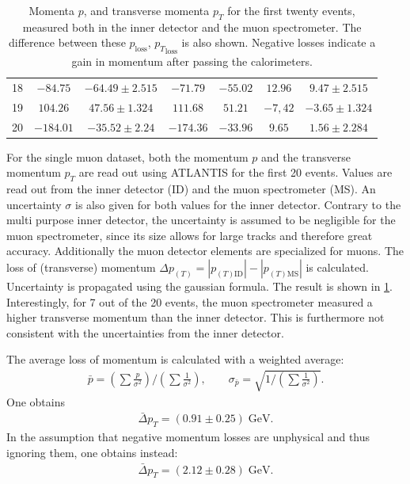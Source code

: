 \documentclass[twoside,        %
               BCOR12mm,       %
               ngerman,english, %
               fleqn,headsepline=false,footsepline=false
              ]{Vorlage/MFPREPORT}
\begin{document}
\begin{table}
\begin{tabular}{|c|c|c|c|c|c|c|}
  18&$-84.75$&$-64.49\pm 2.515$&$-71.79$&$-55.02$&$12.96$&$9.47\pm 2.515$\\
  19&$104.26$&$47.56\pm 1.324$&$111.68$&$51.21$&$-7,42$&$-3.65\pm 1.324$\\
  20&$-184.01$&$-35.52\pm 2.24$&$-174.36$&$-33.96$&$9.65$&$1.56\pm 2.284$\\
  \hline
  \end{tabular}
  \caption{Momenta $p$, and transverse momenta $p_T$ for the first twenty
  events, measured both in the inner detector and the muon spectrometer. The
  difference between these $p_\text{loss}$, ${p_T}_\text{loss}$ is also shown.
  Negative losses indicate a gain in momentum after passing the calorimeters.}
  \label{tab:loss}
\end{table}

For the single muon dataset, both the momentum $p$ and the transverse momentum
$p_T$ are
read out using ATLANTIS for the first 20 events. Values are read out from the
inner detector (ID) and the muon spectrometer (MS). An uncertainty $\sigma$ is
also given for both values for the inner detector. Contrary to the multi
purpose inner detector, the uncertainty is assumed to be negligible for the
muon spectrometer, since its size allows for large tracks and therefore great
accuracy. Additionally the muon detector elements are specialized for muons.
The loss of (transverse) momentum
$\Delta{{p}_{(T)}}=|p_{(T)\text{ID}}|-|p_{(T)\text{MS}}|$ is
calculated. Uncertainty is propagated using the gaussian formula. The result is
shown in \cref{tab:loss}.
Interestingly, for 7 out of the 20 events, the muon spectrometer measured a
higher transverse momentum than the inner detector. This is furthermore not
consistent with the uncertainties from the inner detector.

The average loss of momentum is calculated with a weighted
average:
\begin{align}
    \bar p = (\sum \frac{p}{\sigma^2})/(\sum \frac{1}{\sigma^2}),\qquad \sigma_{\bar p} = \sqrt{1/(\sum \frac{1}{\sigma^2})}.
\end{align}
One obtains
\begin{align}
    \label{eq:resavg1}
    \bar{\Delta}{{p}_{T}}=(0.91\pm0.25)\;\text{GeV}.
\end{align}
In the assumption that negative momentum losses are unphysical and thus
ignoring them, one obtains instead:
\begin{align}
    \bar{\Delta}{{p}_{T}}=(2.12\pm0.28)\;\text{GeV}.
\end{align}
\end{document}
